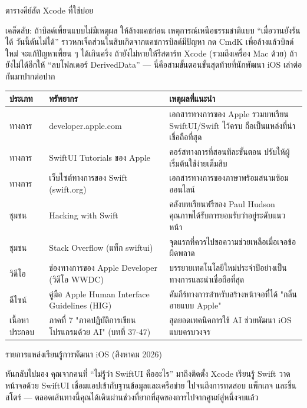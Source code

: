 \begin{center}\small\color{gray}ตารางคีย์ลัด Xcode ที่ใช้บ่อย\end{center}

\begin{tcbinfo}{เคล็ดลับ: ถ้าบิลด์เพี้ยนแบบไม่มีเหตุผล ให้ล้างแคชก่อน}
เหตุการณ์เหนือธรรมชาติแบบ “เมื่อวานยังรันได้ วันนี้ดันไม่ได้” ราวหกเจ็ดส่วนในสิบเกิดจากแคชการบิลด์มีปัญหา กด CmdK เพื่อล้างแล้วบิลด์ใหม่ จะแก้ปัญหาเพี้ยน ๆ ได้เกินครึ่ง ถ้ายังไม่หายให้รีสตาร์ท Xcode (รวมถึงเครื่อง Mac ด้วย) ถ้ายังไม่ได้อีกให้ “ลบโฟลเดอร์ DerivedData” — นี่คือสามขั้นตอนขั้นสุดท้ายที่นักพัฒนา iOS เล่าต่อกันมาปากต่อปาก

\end{tcbinfo}



\begin{center}
\begin{tabularx}{\linewidth}{|X|X|X|}
\hline
\textbf{ประเภท} & \textbf{ทรัพยากร} & \textbf{เหตุผลที่แนะนำ} \tabularnewline
\hline
ทางการ & developer.apple.com & เอกสารทางการของ Apple รวมบทเรียน SwiftUI/Swift ไว้ครบ ถือเป็นแหล่งที่น่าเชื่อถือที่สุด \tabularnewline
ทางการ & SwiftUI Tutorials ของ Apple & คอร์สทางการที่สอนทีละขั้นตอน ปรับให้ผู้เริ่มต้นใช้ง่ายเต็มสิบ \tabularnewline
ทางการ & เว็บไซต์ทางการของ Swift (swift.org) & เอกสารทางการของภาษาพร้อมสนามซ้อมออนไลน์ \tabularnewline
ชุมชน & Hacking with Swift & คลังบทเรียนฟรีของ Paul Hudson คุณภาพได้รับการยอมรับว่าอยู่ระดับแนวหน้า \tabularnewline
ชุมชน & Stack Overflow (แท็ก swiftui) & จุดแรกที่ควรไปขอความช่วยเหลือเมื่อเจอข้อผิดพลาด \tabularnewline
วิดีโอ & ช่องทางการของ Apple Developer (วิดีโอ WWDC) & บรรยายเทคโนโลยีใหม่ประจำปีอย่างเป็นทางการและน่าเชื่อถือที่สุด \tabularnewline
ดีไซน์ & คู่มือ Apple Human Interface Guidelines (HIG) & คัมภีร์ทางการสำหรับสร้างหน้าจอที่ได้ "กลิ่นอายแบบ Apple" \tabularnewline
เนื้อหาประกอบ & ภาคที่ 7 "ภาคปฏิบัติการเขียนโปรแกรมด้วย AI" (บทที่ 37-47) & สุดยอดเทคนิคการใช้ AI ช่วยพัฒนา iOS แบบครบวงจร \tabularnewline
\hline
\end{tabularx}
\end{center}

\begin{center}\small\color{gray}รายการแหล่งเรียนรู้การพัฒนา iOS (สิงหาคม 2026)\end{center}


หันกลับไปมอง คุณจากคนที่ “ไม่รู้ว่า SwiftUI คืออะไร” มาถึงติดตั้ง Xcode เรียนรู้ Swift วาดหน้าจอด้วย SwiftUI เชื่อมแอปเข้ากับฐานข้อมูลและเครือข่าย ไปจนถึงการทดสอบ แพ็กเกจ และขึ้นสโตร์ — ตลอดเส้นทางนี้คุณได้เดินผ่านช่วงที่ยากที่สุดของการไปจากศูนย์สู่หนึ่งจบแล้ว

